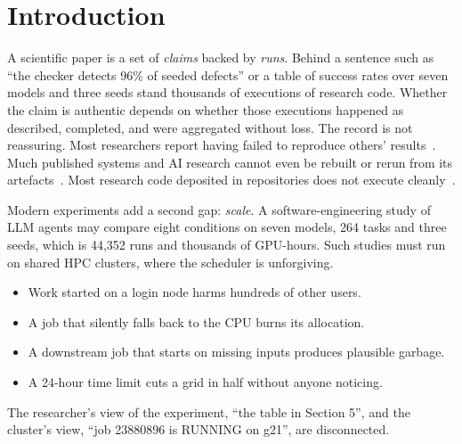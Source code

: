 \documentclass[pdflatex,sn-mathphys-num]{sn-jnl}
\theoremstyle{thmstyleone}%
\theoremstyle{thmstyletwo}%
\theoremstyle{thmstylethree}%
\begin{document}

\maketitle

\section{Introduction}\label{sec:intro}

A scientific paper is a set of \emph{claims} backed by \emph{runs}. Behind a
sentence such as ``the checker detects 96\% of seeded defects'' or a table of
success rates over seven models and three seeds stand thousands of executions
of research code. Whether the claim is authentic depends on whether those
executions happened as described, completed, and were aggregated without
loss. The record is not reassuring. Most researchers report having failed to
reproduce others' results~\cite{baker2016reproducibility}. Much published
systems and AI research cannot even be rebuilt or rerun from its
artefacts~\cite{collberg2016repeatability,gundersen2018state}. Most research
code deposited in repositories does not execute
cleanly~\cite{trisovic2022large,pimentel2019large}.

Modern experiments add a second gap: \emph{scale}. A software-engineering study
of LLM agents may compare eight conditions on seven models, 264 tasks and three
seeds, which is 44{,}352 runs and thousands of GPU-hours. Such studies must run
on shared HPC clusters, where the scheduler is unforgiving.
\begin{itemize}[leftmargin=1.4em, itemsep=1pt]
\item Work started on a login node harms hundreds of other users.
\item A job that silently falls back to the CPU burns its allocation.
\item A downstream job that starts on missing inputs produces plausible
garbage.
\item A 24-hour time limit cuts a grid in half without anyone noticing.
\end{itemize}
The researcher's view of the experiment, ``the table in Section 5'', and the
cluster's view, ``job 23880896 is RUNNING on g21'', are disconnected.
\end{document}
